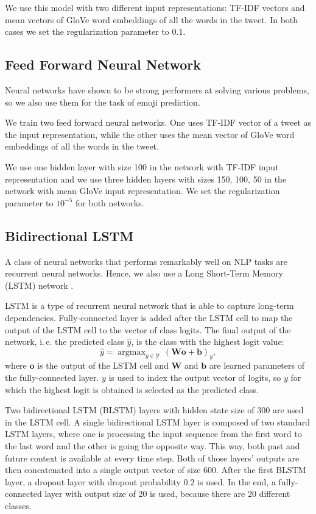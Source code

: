 \documentclass[10pt, a4paper]{article}
\DeclareMathOperator*{\argmax}{argmax}
\begin{document}
We use this model with two different input representations: TF-IDF vectors and 
mean vectors of GloVe word embeddings of all the words in the tweet. In both 
cases we set the regularization parameter to $0.1$.

\subsection{Feed Forward Neural Network}

Neural networks have shown to be strong performers at solving various problems,
so we also use them for the task of emoji prediction. 

We train two feed forward neural networks. One uses TF-IDF vector of a tweet as 
the input representation, while the other uses the mean vector of GloVe word 
embeddings of all the words in the tweet.

We use one hidden layer with size 100 in the network with TF-IDF input 
representation and we use three hidden layers with sizes 150, 100, 50 in the 
network with mean GloVe input representation. We set the regularization 
parameter to $10^{-5}$ for both networks.

\subsection{Bidirectional LSTM}

A class of neural networks that performs remarkably well on NLP tasks are 
recurrent neural networks. Hence, we also use a Long Short-Term Memory (LSTM) 
network \citep{hochreiter1997long}.

LSTM is a type of recurrent neural network that is able to capture long-term 
dependencies. Fully-connected layer is added after the LSTM cell to map the 
output of the LSTM cell to the vector of class logits. The final output of the 
network, i.\,e. the predicted class $\hat{y}$, is the class with the highest 
logit value:
$$\hat{y} = \argmax_{y \in \mathcal{Y}} 
    \,(\mathbf{W} \mathbf{o} + \mathbf{b})_y,$$
where $\mathbf{o}$ is the output of the LSTM cell and $\mathbf{W}$ and 
$\mathbf{b}$ are learned parameters of the fully-connected layer. $y$ is used to
index the output vector of logits, so $y$ for which the highest logit is 
obtained is selected as the predicted class.

Two bidirectional LSTM (BLSTM) layers with hidden state size of 300 are used in 
the LSTM cell. A single bidirectional LSTM layer is composed of two standard 
LSTM layers, where one is processing the input sequence from the first word to 
the last word and the other is going the opposite way. This way, both past and 
future context is available at every time step. Both of those layers' outputs 
are then concatenated into a single output vector of size 600. After the first 
BLSTM layer, a dropout layer with dropout probability $0.2$ is used. In the end,
a fully-connected layer with output size of 20 is used, because there are 20 
different classes.
\end{document}
